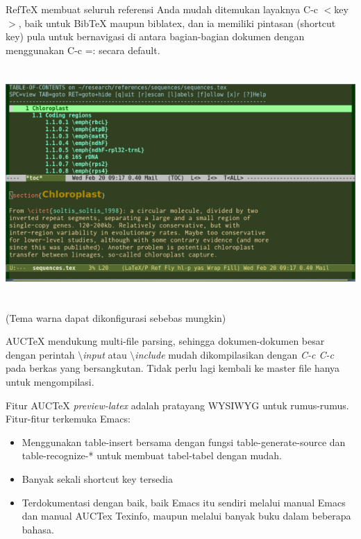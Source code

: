 \begin{enumerate}
RefTeX membuat seluruh referensi Anda mudah ditemukan layaknya C-c $<$key$>$, baik untuk BibTeX maupun biblatex, dan ia memiliki pintasan (shortcut key) pula untuk bernavigasi di antara bagian-bagian dokumen dengan menggunakan C-c =: secara default.


\includegraphics[width=15.64cm,height=8.83cm]{gambar/image3.jpg}

(Tema warna dapat dikonfigurasi sebebas mungkin)

AUCTeX mendukung multi-file parsing, sehingga dokumen-dokumen besar dengan perintah \textit{$\setminus$input} atau \textit{
$\setminus$include} mudah dikompilasikan dengan \textit{C-c C-c} pada berkas yang bersangkutan. Tidak perlu lagi kembali ke master file hanya untuk mengompilasi.
\par \vspace{12pt}
Fitur AUCTeX \textit{preview-latex} adalah pratayang WYSIWYG untuk rumus-rumus. Fitur-fitur terkemuka Emacs:

\begin{itemize}
\item Menggunakan table-insert bersama dengan fungsi 
table-generate-source dan table-recognize-* untuk membuat tabel-tabel dengan mudah.
\item Banyak sekali shortcut key tersedia
\item Terdokumentasi dengan baik, baik Emacs itu sendiri melalui manual Emacs dan manual AUCTex Texinfo, maupun melalui banyak buku dalam beberapa bahasa.
\end{itemize}


\end{enumerate}
